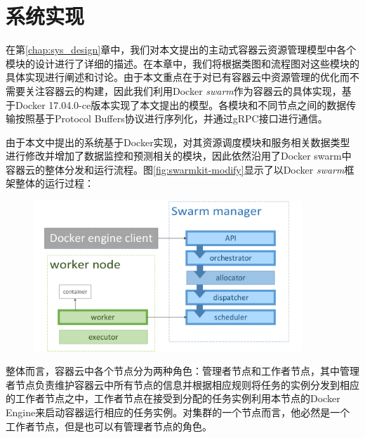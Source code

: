 
\chapter{系统实现}\label{chap:sys_impl}
在第\ref{chap:sys_design}章中，我们对本文提出的主动式容器云资源管理模型中各个模块的设计进行了详细的描述。在本章中，我们将根据类图和流程图对这些模块的具体实现进行阐述和讨论。由于本文重点在于对已有容器云中资源管理的优化而不需要关注容器云的构建，因此我们利用Docker \emph{swarm}作为容器云的具体实现，基于Docker 17.04.0-ce版本实现了本文提出的模型。各模块和不同节点之间的数据传输按照基于Protocol Buffers协议进行序列化，并通过gRPC接口进行通信。

由于本文中提出的系统基于Docker实现，对其资源调度模块和服务相关数据类型进行修改并增加了数据监控和预测相关的模块，因此依然沿用了Docker swarm中容器云的整体分发和运行流程。图\ref{fig:swarmkit-modify}显示了以Docker \emph{swarm}框架整体的运行过程：
\begin{figure}[htbp]
\centering
\includegraphics[width=0.9\textwidth]{./figure/modification}
\end{figure} 

整体而言，容器云中各个节点分为两种角色：管理者节点和工作者节点，其中管理者节点负责维护容器云中所有节点的信息并根据相应规则将任务的实例分发到相应的工作者节点之中，工作者节点在接受到分配的任务实例利用本节点的Docker Engine来启动容器运行相应的任务实例。对集群的一个节点而言，他必然是一个工作者节点，但是也可以有管理者节点的角色。


